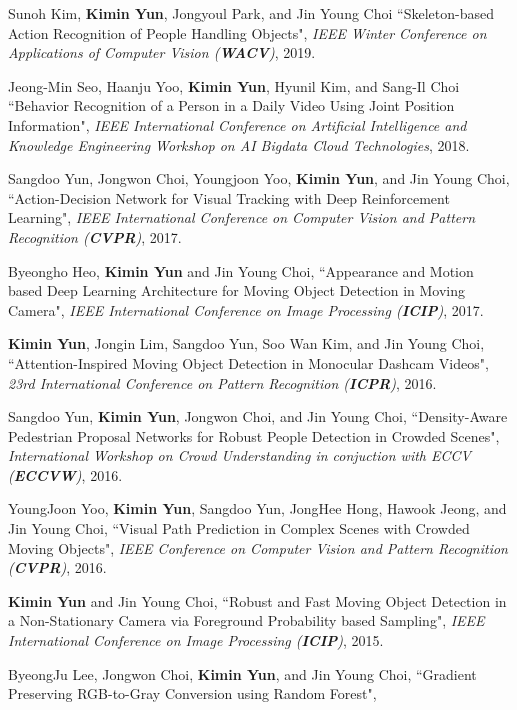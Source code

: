 \documentclass[10pt]{article}
\makeatletter
\newlength{\bibhang}
\newlength{\bibsep}
 {\@listi \global\bibsep\itemsep \global\advance\bibsep by\parsep}
\newenvironment{bibsection}%
        {\vspace{-\baselineskip}\begin{list}{}{%
       \setlength{\leftmargin}{\bibhang}%
       \setlength{\itemindent}{-\leftmargin}%
       \setlength{\itemsep}{\bibsep}%
       \setlength{\parsep}{\z@}%
        \setlength{\partopsep}{0pt}%
        \setlength{\topsep}{0pt}}}
        {\end{list}\vspace{-.6\baselineskip}}
\makeatother
\begin{document}
\begin{bibsection}
	 \item Sunoh Kim, \textbf{Kimin Yun}, Jongyoul Park, and Jin Young Choi
				``Skeleton-based Action Recognition of People Handling Objects",
				 \emph{IEEE Winter Conference on Applications of Computer Vision (\textbf{WACV})}, 2019. 
	\item Jeong-Min Seo, Haanju Yoo, \textbf{Kimin Yun}, Hyunil Kim, and Sang-Il Choi
				``Behavior Recognition of a Person in a Daily Video Using Joint Position Information",
				 \emph{IEEE International Conference on Artificial Intelligence and Knowledge Engineering Workshop on AI Bigdata Cloud Technologies}, 2018. 			 
	\item  Sangdoo Yun, Jongwon Choi, Youngjoon Yoo, \textbf{Kimin Yun}, and Jin Young Choi,
				``Action-Decision Network for Visual Tracking with Deep Reinforcement Learning",
				 \emph{IEEE International Conference on Computer Vision and Pattern Recognition (\textbf{CVPR})}, 2017.
	\item Byeongho Heo, \textbf{Kimin Yun} and Jin Young Choi,
				``Appearance and Motion based Deep Learning Architecture for Moving Object Detection in Moving Camera",
				 \emph{IEEE International Conference on Image Processing (\textbf{ICIP})}, 2017. 
		\item  \textbf{Kimin Yun}, Jongin Lim, Sangdoo Yun, Soo Wan Kim, and Jin Young Choi,
				``Attention-Inspired Moving Object Detection in Monocular Dashcam Videos",
				 \emph{23rd International Conference on Pattern Recognition (\textbf{ICPR})}, 2016.
		\item  Sangdoo Yun, \textbf{Kimin Yun}, Jongwon Choi, and Jin Young Choi,
				``Density-Aware Pedestrian Proposal Networks for Robust People Detection in Crowded Scenes",
				 \emph{International Workshop on Crowd Understanding in conjuction with ECCV (\textbf{ECCVW})}, 2016.
		\item YoungJoon Yoo, \textbf{Kimin Yun}, Sangdoo Yun, JongHee Hong, Hawook Jeong, and Jin Young Choi,
				``Visual Path Prediction in Complex Scenes with Crowded Moving Objects",
				 \emph{IEEE Conference on Computer Vision and Pattern Recognition (\textbf{CVPR})}, 2016.
		\item \textbf{Kimin Yun} and Jin Young Choi,
				``Robust and Fast Moving Object Detection in a Non-Stationary Camera via Foreground Probability based Sampling",
				 \emph{IEEE International Conference on Image Processing (\textbf{ICIP})}, 2015.
		\item ByeongJu Lee, Jongwon Choi, \textbf{Kimin Yun}, and Jin Young Choi,
				``Gradient Preserving RGB-to-Gray Conversion using Random Forest",

\end{bibsection}
\end{document}
